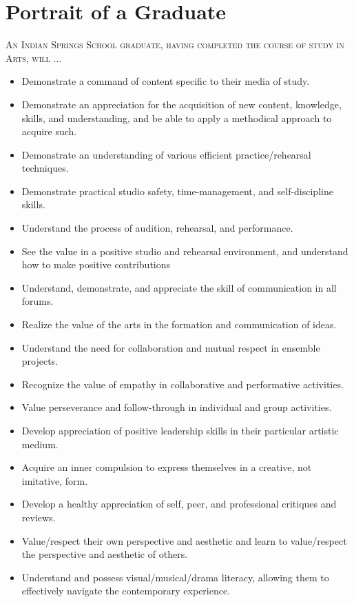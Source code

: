 \section{Portrait of a Graduate}

\textsc{An Indian Springs School graduate, having completed the course of study in Arts, will} $\ldots$ 

\begin{itemize}
  \item Demonstrate a command of content specific to their media of study. 
\item Demonstrate an appreciation for the acquisition of new content, knowledge, skills, and understanding, and be able to apply a methodical approach to acquire such.
\item Demonstrate an understanding of various efficient practice/rehearsal techniques.
\item Demonstrate practical studio safety, time-management, and self-discipline skills.
\item Understand the process of audition, rehearsal, and performance.
\item See the value in a positive studio and rehearsal environment, and understand how to make positive contributions
\item Understand, demonstrate, and appreciate the skill of communication in all forums.
\item Realize the value of the arts in the formation and communication of ideas.
\item Understand the need for collaboration and mutual respect in ensemble projects.
\item Recognize the value of empathy in collaborative and performative activities.
\item Value perseverance and follow-through in individual and group activities.
\item Develop appreciation of positive leadership skills in their particular artistic medium.
\item Acquire an inner compulsion to express themselves in a creative, not imitative, form.
\item Develop a healthy appreciation of self, peer, and professional critiques and reviews.
\item Value/respect their own perspective and aesthetic and learn to value/respect the perspective and aesthetic of others.
\item Understand and possess visual/musical/drama literacy, allowing them to effectively navigate the contemporary experience. 

\end{itemize}
